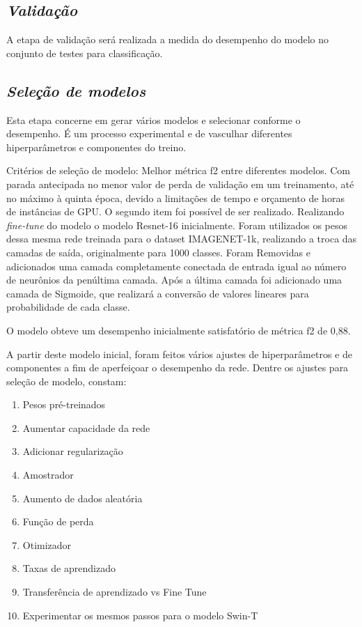 \subsection{\textit{Validação}}\label{sec:Cap3_Validacao}

A etapa de validação será realizada a medida do desempenho do modelo no conjunto de testes para classificação.

\subsection{\textit{Seleção de modelos}}\label{sec:Cap3_SelecaoModelos}

Esta etapa concerne em gerar vários modelos e selecionar conforme o desempenho. É um processo experimental e de vasculhar diferentes hiperparâmetros e componentes do treino.



Critérios de seleção de modelo:
Melhor métrica f2 entre diferentes modelos. Com parada antecipada no menor valor de perda de validação em um treinamento, até no máximo à quinta época, devido a limitações de tempo e orçamento de horas de instâncias de GPU.
O segundo item foi possível de ser realizado. Realizando \textit{fine-tune} do modelo o modelo Resnet-16 inicialmente. Foram utilizados os pesos dessa mesma rede treinada para o dataset IMAGENET-1k, realizando a troca das camadas de saída, originalmente para 1000 classes. Foram Removidas e adicionados uma camada completamente conectada de entrada igual ao número de neurônios da penúltima camada. Após a última camada foi adicionado uma camada de Sigmoide, que realizará a conversão de valores lineares para probabilidade de cada classe.

O modelo obteve um desempenho inicialmente satisfatório de métrica f2 de 0,88.

A partir deste modelo inicial, foram feitos vários ajustes de hiperparâmetros e de componentes a fim de aperfeiçoar o desempenho da rede. Dentre os ajustes para seleção de modelo, constam:


\begin{enumerate}
    \item Pesos pré-treinados
    \item Aumentar capacidade da rede
    \item Adicionar regularização 
    \item Amostrador
    \item Aumento de dados aleatória
    \item Função de perda
    \item Otimizador
    \item Taxas de aprendizado
    \item Transferência de aprendizado vs Fine Tune
    \item Experimentar os mesmos passos para o modelo Swin-T
\end{enumerate}


